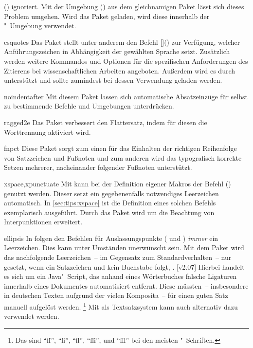 \begin{packages}
  () ignoriert. Mit der Umgebung 
  () aus dem gleichnamigen Paket lässt 
  sich dieses Problem umgehen. Wird das Paket geladen, wird diese innerhalb der 
  "~Umgebung verwendet.
\item[csquotes]
  Das Paket stellt unter anderem den Befehl 
  []() zur Verfügung, welcher 
  Anführungszeichen in Abhängigkeit der gewählten Sprache setzt. Zusätzlich 
  werden weitere Kommandos und Optionen für die spezifischen Anforderungen des 
  Zitierens bei wissenschaftlichen Arbeiten angeboten. Außerdem wird es durch 
   unterstützt und sollte zumindest bei dessen Verwendung 
  geladen werden.
\item[noindentafter]
  Mit diesem Paket lassen sich automatische Absatzeinzüge für selbst zu 
  bestimmende Befehle und Umgebungen unterdrücken.
\item[ragged2e]
  Das Paket verbessert den Flattersatz, indem für diesen die Worttrennung 
  aktiviert wird.
\item[fnpct]
  Diese Paket sorgt zum einen für das Einhalten der richtigen Reihenfolge von 
  Satzzeichen und Fußnoten und zum anderen wird das typografisch korrekte 
  Setzen mehrerer, nacheinander folgender Fußnoten unterstützt. 
\item[xspace,xpunctuate]
  Mit  kann bei der Definition eigener Makros der Befehl 
  () genutzt werden. Dieser setzt ein 
  gegebenenfalls notwendiges Leerzeichen automatisch. In 
  \autoref{sec:tips:xspace} ist die Definition eines solchen Befehls 
  exemplarisch ausgeführt. Durch das Paket  wird 
   um die Beachtung von Interpunktionen erweitert.
\item[ellipsis]
  In  folgen den Befehlen für Auslassungspunkte ( und 
  ) \emph{immer} ein Leerzeichen. Dies kann unter Umständen 
  unerwünscht sein. Mit dem Paket  wird das nachfolgende 
  Leerzeichen~-- im Gegensatz zum Standardverhalten~-- nur gesetzt, wenn ein 
  Satzzeichen und kein Buchstabe folgt, .
%
  [v2.07]%
  Hierbei handelt es sich um ein Java"~Script, das anhand eines Wörterbuches 
  falsche Ligaturen innerhalb eines Dokumentes automatisiert entfernt. Diese 
  müssten~-- insbesondere in deutschen Texten aufgrund der vielen Komposita~-- 
  für einen guten Satz manuell aufgelöst werden.%
  \footnote{%
    Das sind \enquote{ff}, \enquote{fi}, \enquote{fl}, \enquote{ffi}, und 
    \enquote{ffl} bei den meisten "~Schriften.%
  }
  Mit  als Textsatzsystem kann auch  
  alternativ dazu verwendet werden.%
\end{packages}
